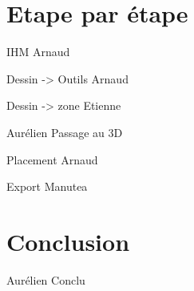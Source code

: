 \documentclass[a4paper,10pt]{beamer}
\begin{document}
			
	\section{Etape par étape}
	\begin{frame}
		IHM Arnaud
	\end{frame}
	
	\begin{frame}
		Dessin -> Outils Arnaud
	\end{frame}
	
	\begin{frame}
		Dessin -> zone Etienne
	\end{frame}
	
	\begin{frame}
		Aurélien Passage au 3D
	\end{frame}
	
	\begin{frame}
		Placement Arnaud
	\end{frame}
	
	\begin{frame}
		Export Manutea
	\end{frame}
	
	\section{Conclusion}
	
	\begin{frame}
		Aurélien Conclu
	\end{frame}
		
\end{document}
